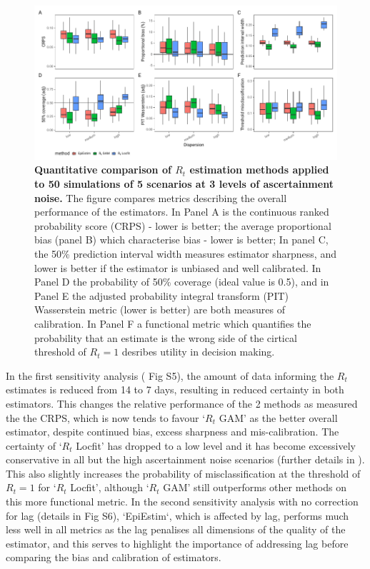 \documentclass[10pt,letterpaper]{article}
\begin{document}
\begin{figure}[!ht]
\centerline{\includegraphics{fig/fig2-comparison}}
\caption{{\bf Quantitative comparison of $R_t$ estimation methods applied to 50 simulations of 5 scenarios at 3 levels of ascertainment noise.} The figure compares metrics describing the overall performance of the estimators. In Panel A is the continuous ranked probability score (CRPS) - lower is better; the average proportional bias (panel B) which characterise bias - lower is better; In panel C, the 50\% prediction interval width measures estimator sharpness, and lower is better if the estimator is unbiased and well calibrated. In Panel D the probability of 50\% coverage (ideal value is 0.5), and in Panel E the adjusted probability integral transform (PIT) Wasserstein metric (lower is better) are both measures of calibration. In Panel F a functional metric which quantifies the probability that an estimate is the wrong side of the cirtical threshold of $R_t=1$ desribes utility in decision making.}
\label{fig2}
\end{figure}

In the first sensitivity analysis ( Fig S5), the amount of data informing the $R_t$ estimates is reduced from 14 to 7 days, resulting in reduced certainty in both estimators. This changes the relative performance of the 2 methods as measured the the CRPS, which is now tends to favour `$R_t$ GAM' as the better overall estimator, despite continued bias, excess sharpness and mis-calibration. The certainty of `$R_t$ Locfit' has dropped to a low level and it has become excessively conservative in all but the high ascertainment noise scenarios (further details in ). This also slightly increases the probability of misclassification at the threshold of $R_t=1$ for `$R_t$ Locfit', although `$R_t$ GAM' still outperforms other methods on this more functional metric. In the second sensitivity analysis with no correction for lag (details in  Fig S6), `EpiEstim`, which is affected by lag, performs much less well in all metrics as the lag penalises all dimensions of the quality of the estimator, and this serves to highlight the importance of addressing lag before comparing the bias and calibration of estimators.
\end{document}
